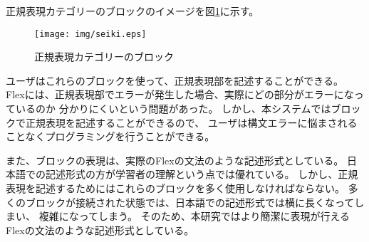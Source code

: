 \documentclass{risepaper}
\begin{document}
\begin{itemize}
\begin{itemize}

\end{itemize}

正規表現カテゴリーのブロックのイメージを図\ref{fig:seiki}に示す。

\newpage

\begin{figure}[h]
\begin{center}
\texttt{[image: img/seiki.eps]}
\end{center}%
\caption{正規表現カテゴリーのブロック}%
\label{fig:seiki}
\end{figure}%

ユーザはこれらのブロックを使って、正規表現部を記述することができる。
Flexには、正規表現部でエラーが発生した場合、実際にどの部分がエラーになっているのか
分かりにくいという問題があった。
しかし、本システムではブロックで正規表現を記述することができるので、
ユーザは構文エラーに悩まされることなくプログラミングを行うことができる。

また、ブロックの表現は、実際のFlexの文法のような記述形式としている。
日本語での記述形式の方が学習者の理解という点では優れている。
しかし、正規表現を記述するためにはこれらのブロックを多く使用しなければならない。
多くのブロックが接続された状態では、日本語での記述形式では横に長くなってしまい、
複雑になってしまう。
そのため、本研究ではより簡潔に表現が行えるFlexの文法のような記述形式としている。


\end{itemize}
\end{document}

